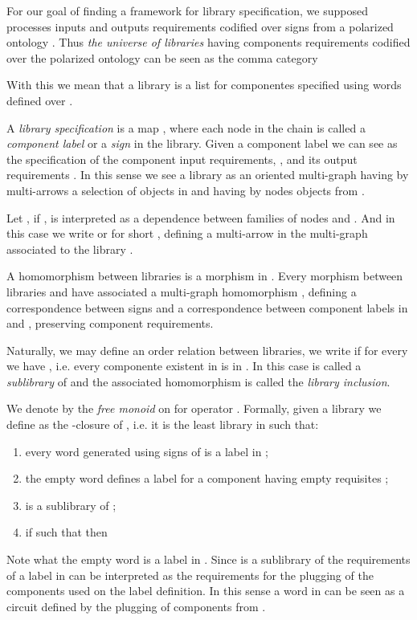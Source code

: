 \documentclass[oribibl]{llncs}
\begin{document}
For our goal of finding a framework for library specification,
we supposed processes inputs and outputs requirements codified over
signs from a polarized ontology . Thus \emph{the
universe of libraries} having components requirements codified over
the polarized ontology  can be seen as the comma category

With this we mean that a library is a list for componentes specified using words defined over .

A \emph{library specification} is a map , where each node in the chain  is
called a \emph{component label} or a \emph{sign} in the library. Given a component label
 we can see  as the
specification of the component input requirements, , and its
output requirements . In this sense we see a library as an
oriented multi-graph having by multi-arrows a selection of
objects in  and having by nodes objects
from .

Let , if
,  is interpreted as a dependence between families of
nodes  and . And in this case we write
 or for short , defining
a multi-arrow in the  multi-graph  associated to the library
.

A homomorphism between libraries is a morphism in . Every morphism 
between libraries  and  have associated a multi-graph
homomorphism , defining a correspondence between signs and a correspondence between component labels in  and , preserving component requirements.

Naturally, we may define an order relation between libraries, we write  if for every  we have , i.e. every componente existent in  is in . In this case  is called a \emph{sublibrary} of  and the associated homomorphism  is called the \emph{library inclusion}.

We denote by  the \emph{free monoid} on  for operator . Formally, given a library  we define  as the -closure of , i.e. it is the least library in  such that:
\begin{enumerate}
  \item every word generated using signs of  is a label in ;
  \item the empty word defines a label for a component having empty requisites ;
  \item  is a sublibrary of ;
  \item if  such that  then
  
\end{enumerate}
Note what the empty word  is a label in . Since  is a sublibrary of  the requirements of a label in  can be interpreted as the requirements for the plugging of the components used on the label definition. In this sense a word in  can be seen as a circuit defined by the plugging of components from .
\end{document}

